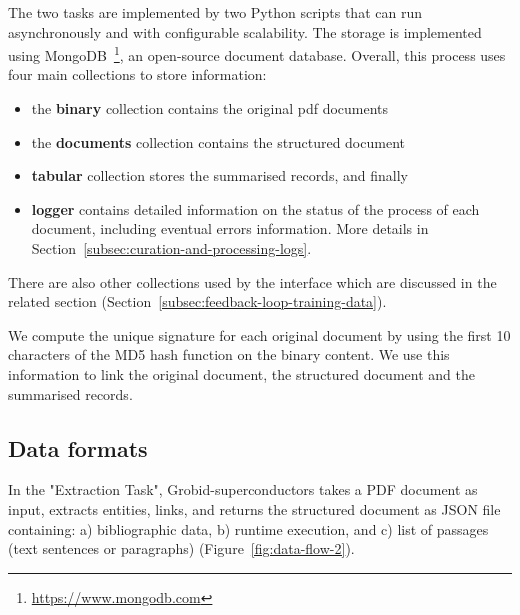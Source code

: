 \documentclass[a4paper]{article}
\begin{document}
The two tasks are implemented by two Python scripts that can run asynchronously and with configurable scalability.
The storage is implemented using MongoDB~\footnote{\url{https://www.mongodb.com}}, an open-source document database. 
Overall, this process uses four main collections to store information: 
\begin{itemize}
    \item the \textbf{binary} collection contains the original pdf documents 
    \item the \textbf{documents} collection contains the structured document
    \item \textbf{tabular} collection stores the summarised records, and finally 
    \item \textbf{logger} contains detailed information on the status of the process of each document, including eventual errors information. More details in Section~\ref{subsec:curation-and-processing-logs}.
\end{itemize}
There are also other collections used by the interface which are discussed in the related section (Section~\ref{subsec:feedback-loop-training-data}).

We compute the unique signature for each original document by using the first 10 characters of the MD5 hash function on the binary content. 
We use this information to link the original document, the structured document and the summarised records.


\subsection{Data formats}

In the "Extraction Task", Grobid-superconductors takes a PDF document as input, extracts entities, links, and returns the structured document as JSON file containing: a) bibliographic data, b) runtime execution, and c) list of passages (text sentences or paragraphs) (Figure~\ref{fig:data-flow-2}). 
\end{document}
